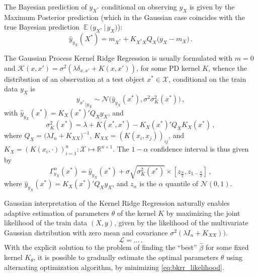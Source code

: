 \documentclass{ITaSconf}
\newcommand{\ex}{\mathop{\mathbb{E}}\nolimits}
\newcommand{\Ncal}{\mathcal{N}}
\newcommand{\Kcal}{\mathcal{K}}
\newcommand{\Xcal}{\mathcal{X}}
\newcommand{\Real}{\mathbb{R}}
\newcommand{\Lcal}{\mathcal{L}}
\begin{document}
The Bayesian prediction of $y_{X^*}$ conditional on observing $y_X$ is given by
the Maximum Posterior prediction (which in the Gaussian case coincides with the
true Bayesian prediction $\ex\bigl(y_{X^*}\,|\, y_X\bigr)$):
\begin{equation*}
  \hat{y}_{y_X}(X^*) = m_{X^*} + K_{X^*X} Q_X \bigl(y_X - m_X\bigr) \,.
\end{equation*}

The Gaussian Process Kernel Ridge Regression is usually formulated with $m=0$ and
$\Kcal(x,x') = \sigma^2(\lambda \delta_{x,x'} + K(x,x'))$, for some PD kernel $K$,
whence the distribution of an observation at a test object $x^*\in \Xcal$, conditional
on the train data $y_X$ is
\begin{equation} \label{eq:gp_cond_dist}
{y_{x^*}}_{|y_X}
  \sim \Ncal\bigl( \hat{y}_{y_X}(x^*), \sigma^2 \sigma_K^2(x^*) \bigr) \,,
\end{equation}
with $\hat{y}_{y_X}(x^*) = K_X(x^*)' Q_X y_X$, and
\begin{equation*}
  \sigma_K^2(x^*)
    = \lambda + K(x^*, x^*) - K_X(x^*)' Q_X K_X(x^*) \,,
\end{equation*}
where $Q_X = \bigl(\lambda I_n + K_{XX}\bigr)^{-1}$, $K_{XX} = (K(x_i,x_j))_{ij}$,
and $K_X = (K(x_i, \cdot))_{i=1}^n: \Xcal \mapsto \Real^{n\times1}$. The $1-\alpha$
confidence interval is thus given by
\begin{equation} \label{eq:gp_conf_int}
\Gamma^\alpha_{y_X}(x^*)
  = \hat{y}_{y_X}(x^*)
  + \sigma \sqrt{\sigma_K^2(x^*)}
  \times [z_{\frac{\alpha}{2}}, z_{1-\frac{\alpha}{2}}]
  \,,
\end{equation}
where $\hat{y}_{y_X}(x^*) = K_X(x^*)' Q_X y_X$, and $z_\alpha$ is the $\alpha$
quantile of $\Ncal(0, 1)$.

Gaussian interpretation of the Kernel Ridge Regression naturally enables adaptive
estimation of parameters $\theta$ of the kernel $K$ by maximizing the joint likelihood
of the train data $(X, y)$, given by the likelihood of the multivariate Gaussian
distribution with zero mean and covariance $\sigma^2 (\lambda I_n + K_{XX}))$.
\begin{equation} \label{eq:bkrr_likelihood}
  \Lcal = \ldots
  \,.
\end{equation}
With the explicit solution to the problem of finding the ``best'' $\hat{\beta}$ for
some fixed kernel $K_\theta$, it is possible to gradually estimate the optimal parameters
$\theta$ using alternating optimization algorithm, by minimizing \ref{eq:bkrr_likelihood}.
\end{document}
